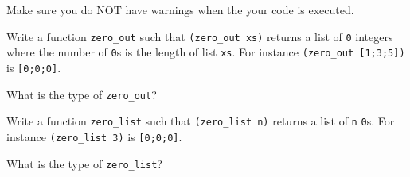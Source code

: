 

\renewcommand\AUTHOR{jdoe5@cougars.ccis.edu} %


\topmattertwo

Make sure you do NOT have warnings when the your code is executed.

\nextq
Write a function \verb!zero_out! such that
\verb!(zero_out xs)! returns a list of
\verb!0! integers where the number of \verb!0!s
is the length of list \verb!xs!.
For instance \verb!(zero_out [1;3;5])! is \verb![0;0;0]!.
\\
\ANSWER
\begin{answercode}

\end{answercode}

\nextq
What is the type of \verb!zero_out!?
\\
\ANSWER
\begin{answercode}

\end{answercode}

\nextq
Write a function \verb!zero_list! such that
\verb!(zero_list n)! returns a list of \verb!n! \verb!0!s.
For instance \verb!(zero_list 3)! is \verb![0;0;0]!.
\\
\ANSWER
\begin{answercode}

\end{answercode}

\nextq
What is the type of \verb!zero_list!?
\\
\ANSWER
\begin{answercode}

\end{answercode}

\newpage


